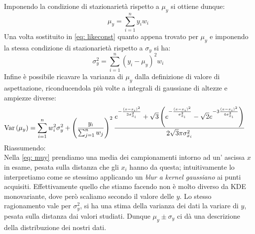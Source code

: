 \documentclass{article}[a4paper, oneside, 11pt]
\begin{document}
Imponendo la condizione di stazionarietà rispetto a $\mu_y$ si ottiene dunque:
\begin{equation}\label{eq: muy}
	\mu_y = \sum_{i=1}^{n} y_i w_i 
\end{equation} 
Una volta sostituito in \eqref{eq: likeconst} quanto appena trovato per $\mu_y$
e imponendo la stessa condizione di stazionarietà rispetto a $\sigma_y$ si ha:
\begin{equation}\label{eq: sigmay}
	\sigma_y^2 = \sum_{i=1}^{n} (y_i - \mu_y)^2 w_i
\end{equation}
Infine è possibile ricavare la varianza di $\mu_y$ dalla definizione di valore
di aspettazione, riconducendola più volte a integrali di gaussiane di altezze
e ampiezze diverse:
\begin{align} \label{aln: varmuy}
	\text{Var}\left(\mu_y\right) &= \sum_{i=1}^{n} w_i^2 \sigma_y^2 + 
	\left(\frac{y_i}{\sum_{j=1}^{n} w_j} \right)^2 \frac{
	e^{-\frac{(x-x_i)^2}{3 \sigma_{x_i}^2}} +  
	\sqrt{3} \left( e^{-\frac{(x-x_i)^2}{\sigma_{x_i}^2}} -
	\sqrt{2} e^{-3 \frac{(x-x_i)^2}{4 \sigma_{x_i}^2}} \right)
	} {2 \sqrt{3}\pi \sigma_{x_i}^2} 
\end{align}
Riassumendo:\\
Nella \eqref{eq: muy} prendiamo una media dei campionamenti intorno ad un'
ascissa $x$ in esame, pesata sulla distanza che gli $x_i$ hanno da questa; 
intuitivamente lo interpretiamo come se stessimo applicando un 
\emph{blur a kernel gaussiano} ai punti acquisiti.
Effettivamente quello che stiamo facendo non è molto diverso da KDE monovariante, dove però scaliamo secondo il valore delle $y$.
Lo stesso ragionamento vale per $\sigma_y^2$, si ha una stima della varianza
dei dati la variare di $y$, pesata sulla distanza dai valori studiati. Dunque
$\mu_y \pm \sigma_y$ ci dà una descrizione della distribuzione dei nostri dati.

\end{document}
